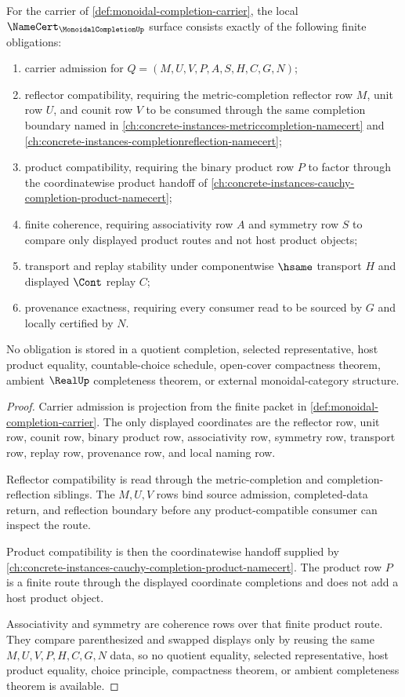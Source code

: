 \begin{theorem}
\label{thm:monoidal-completion-namecert-obligations}
For the carrier of \autoref{def:monoidal-completion-carrier}, the local $\NameCert_{\MonoidalCompletionUp}$ surface consists exactly of the following finite obligations:
\begin{enumerate}
\item carrier admission for $Q=(M,U,V,P,A,S,H,C,G,N)$;
\item reflector compatibility, requiring the metric-completion reflector row $M$, unit row $U$, and counit row $V$ to be consumed through the same completion boundary named in \autoref{ch:concrete-instances-metriccompletion-namecert} and \autoref{ch:concrete-instances-completionreflection-namecert};
\item product compatibility, requiring the binary product row $P$ to factor through the coordinatewise product handoff of \autoref{ch:concrete-instances-cauchy-completion-product-namecert};
\item finite coherence, requiring associativity row $A$ and symmetry row $S$ to compare only displayed product routes and not host product objects;
\item transport and replay stability under componentwise $\hsame$ transport $H$ and displayed $\Cont$ replay $C$;
\item provenance exactness, requiring every consumer read to be sourced by $G$ and locally certified by $N$.
\end{enumerate}
No obligation is stored in a quotient completion, selected representative, host product equality, countable-choice schedule, open-cover compactness theorem, ambient $\RealUp$ completeness theorem, or external monoidal-category structure.
\end{theorem}
\begin{proof}
Carrier admission is projection from the finite packet in \autoref{def:monoidal-completion-carrier}. The only displayed coordinates are the reflector row, unit row, counit row, binary product row, associativity row, symmetry row, transport row, replay row, provenance row, and local naming row.

Reflector compatibility is read through the metric-completion and completion-reflection siblings. The $M,U,V$ rows bind source admission, completed-data return, and reflection boundary before any product-compatible consumer can inspect the route.

Product compatibility is then the coordinatewise handoff supplied by \autoref{ch:concrete-instances-cauchy-completion-product-namecert}. The product row $P$ is a finite route through the displayed coordinate completions and does not add a host product object.

Associativity and symmetry are coherence rows over that finite product route. They compare parenthesized and swapped displays only by reusing the same $M,U,V,P,H,C,G,N$ data, so no quotient equality, selected representative, host product equality, choice principle, compactness theorem, or ambient completeness theorem is available.
\end{proof}

